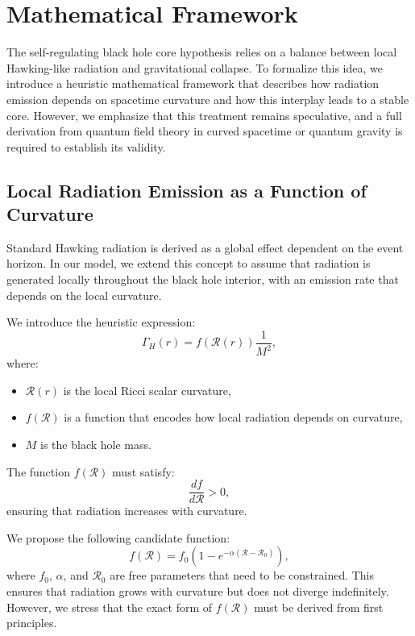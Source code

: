 \section{Mathematical Framework}
\label{sec:math_framework}

The self-regulating black hole core hypothesis relies on a balance between local Hawking-like radiation and gravitational collapse. To formalize this idea, we introduce a heuristic mathematical framework that describes how radiation emission depends on spacetime curvature and how this interplay leads to a stable core. However, we emphasize that this treatment remains speculative, and a full derivation from quantum field theory in curved spacetime or quantum gravity is required to establish its validity.

\subsection{Local Radiation Emission as a Function of Curvature}

Standard Hawking radiation is derived as a global effect dependent on the event horizon. In our model, we extend this concept to assume that radiation is generated locally throughout the black hole interior, with an emission rate that depends on the local curvature. 

We introduce the heuristic expression:
\begin{equation}
    \Gamma_H(r) = f(\mathcal{R}(r)) \frac{1}{M^2},
\end{equation}
where:
\begin{itemize}
    \item \( \mathcal{R}(r) \) is the local Ricci scalar curvature,
    \item \( f(\mathcal{R}) \) is a function that encodes how local radiation depends on curvature,
    \item \( M \) is the black hole mass.
\end{itemize}

The function \( f(\mathcal{R}) \) must satisfy:
\begin{equation}
    \frac{df}{d\mathcal{R}} > 0,
\end{equation}
ensuring that radiation increases with curvature. 

We propose the following candidate function:
\begin{equation}
    f(\mathcal{R}) = f_0 \left( 1 - e^{-\alpha (\mathcal{R} - \mathcal{R}_0)} \right),
\end{equation}
where \( f_0 \), \( \alpha \), and \( \mathcal{R}_0 \) are free parameters that need to be constrained. This ensures that radiation grows with curvature but does not diverge indefinitely. However, we stress that the exact form of \( f(\mathcal{R}) \) must be derived from first principles.

